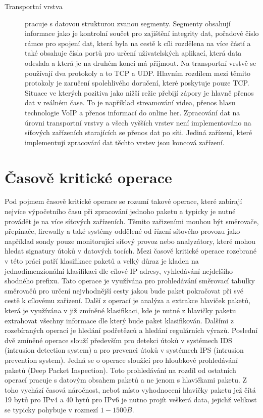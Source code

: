 \begin{description}
\item[Transportní vrstva]\label{layers:transport} %
pracuje s datovou strukturou zvanou segmenty.
Segmenty obsahují informace jako je kontrolní součet pro zajištění integrity dat,
pořadové číslo rámce pro spojení dat, která byla na cestě k cíli rozdělena na více částí a také obsahuje čísla portů
pro určení uživatelských aplikací, která data odeslala a která je na druhém konci má přijmout.
Na transportní vrstvě se používají dva protokoly a to TCP a UDP. Hlavním rozdílem mezi těmito protokoly
je zaručení spolehlivého doručení, které poskytuje pouze TCP. Situace ve kterých pozitiva jako
nižší režie přebijí zápory je hlavně přenos dat v reálném čase. To je například streamování videa,
přenos hlasu technologie VoIP a přenos informací do online her.
Zpracování dat na úrovni transportní vrstvy a všech vyšších vrstev není implementováno na síťových
zařízeních starajících se přenos dat po síti. Jediná zařízení, které implementují zpracování
dat těchto vrstev jsou koncová zařízení.

\end{description}

\section{Časově kritické operace} %
Pod pojmem časově kritické operace se rozumí takové operace, které zabírají nejvíce výpočetního
času při zpracování jednoho paketu a typicky je nutné provádět je na více síťových zařízeních.
Těmito zařizeními mouhou být směrovače, přepínače, firewally a také systémy
oddělené od řízení síťového provozu jako například sondy pouze monitorující síťový provoz nebo analyzátory,
které mohou hledat signatury útoků v datových tocích.
Mezi časově kritické operace rozebrané v této práci patří klasifikace paketů a velký důraz je kladen na
jednodimenzionální klasifikaci dle cílové IP adresy, vyhledávání nejdelšího shodného prefixu.
Tato operace je využívána pro prohledávání směrovací tabulky směrovačů pro určení nejvhodnější cesty jakou
bude paket pokračovat při své cestě k cílovému zařizení.
Další z operací je analýza a extrakce hlaviček paketů, která je využívána v již zmíněné klasifikaci,
kde je nutné z hlavičky paketu extrahovat všechny informace dle který bude paket klasifikován.
Dalšími z rozebíraných operací je hledání podřetězců a hledání regulárních výrazů.
Poslední dvě zmíněné operace slouží především pro detekci útoků v systémech IDS (intrusion detection system)
a pro prevenci útoků v systémech IPS (intrusion prevention system). Jedná se o operace sloužící
pro hloubkové prohledávání paketů (Deep Packet Inspection). Toto prohledávání na rozdíl od ostatních operací
pracuje s datovým obsahem paketů a ne jenom s hlavičkami paketu. Z toho vychází časová náročnost,
neboť místo vyhodnocení hlavičky paketu jež čítá 19 bytů pro IPv4 a 40 bytů pro IPv6 je nutno
projít veškerá data, jejichž velikost se typicky pohybuje v rozmezí $1 - 1500B$.


